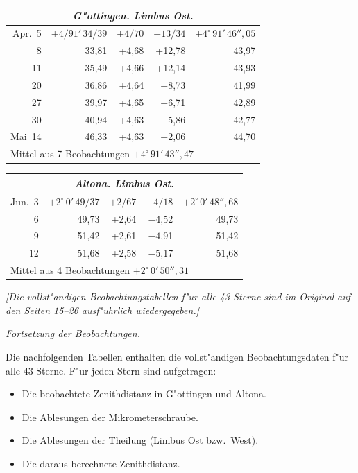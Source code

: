 \documentclass[12pt,a4paper]{article}
\theoremstyle{plain}
\theoremstyle{definition}
\theoremstyle{remark}
\begin{document}
\begin{small}
\begin{tabular}{@{}r|r|r|r|r@{}}
\multicolumn{5}{c}{\textit{G"ottingen. Limbus Ost.}}\\
\hline
\rule{0pt}{1em}Apr.~5 & $+4/91'\,34/39$ & $+4/70$ & $+13/34$ & $+4^\circ\,91'\,46''{,}05$ \\
\phantom{0}8 & 33,81 & +4,68 & +12,78 & 43,97 \\
11 & 35,49 & +4,66 & +12,14 & 43,93 \\
20 & 36,86 & +4,64 & +\phantom{0}8,73 & 41,99 \\
27 & 39,97 & +4,65 & +\phantom{0}6,71 & 42,89 \\
30 & 40,94 & +4,63 & +\phantom{0}5,86 & 42,77 \\
Mai~14 & 46,33 & +4,63 & +\phantom{0}2,06 & 44,70 \\
\hline
\multicolumn{5}{l}{Mittel aus 7 Beobachtungen $+4^\circ\,91'\,43''{,}47$}
\end{tabular}
\hfill
\begin{tabular}{@{}r|r|r|r|r@{}}
\multicolumn{5}{c}{\textit{Altona. Limbus Ost.}}\\
\hline
\rule{0pt}{1em}Jun.~3 & $+2^\circ\,0'\,49/37$ & $+2/67$ & $-4/18$ & $+2^\circ\,0'\,48''{,}68$ \\
\phantom{0}6 & 49,73 & +2,64 & $-4$,52 & 49,73 \\
\phantom{0}9 & 51,42 & +2,61 & $-4$,91 & 51,42 \\
12 & 51,68 & +2,58 & $-5$,17 & 51,68 \\
\hline
\multicolumn{5}{l}{Mittel aus 4 Beobachtungen $+2^\circ\,0'\,50''{,}31$}
\end{tabular}
\end{small}

\vspace{0.8cm}
\begin{center}
\textit{[Die vollst"andigen Beobachtungstabellen f"ur alle 43 Sterne sind im Original}
\textit{auf den Seiten 15--26 ausf"uhrlich wiedergegeben.]}
\end{center}

\newpage

\begin{center}
\textit{Fortsetzung der Beobachtungen.}
\end{center}

\vspace{0.5cm}
\noindent
Die nachfolgenden Tabellen enthalten die vollst"andigen Beobachtungsdaten
f"ur alle 43 Sterne. F"ur jeden Stern sind aufgetragen:
\begin{itemize}[nosep]
\item[1.] Die beobachtete Zenithdistanz in G"ottingen und Altona.
\item[2.] Die Ablesungen der Mikrometerschraube.
\item[3.] Die Ablesungen der Theilung (Limbus Ost bzw.~West).
\item[4.] Die daraus berechnete Zenithdistanz.
\end{itemize}
\end{document}
